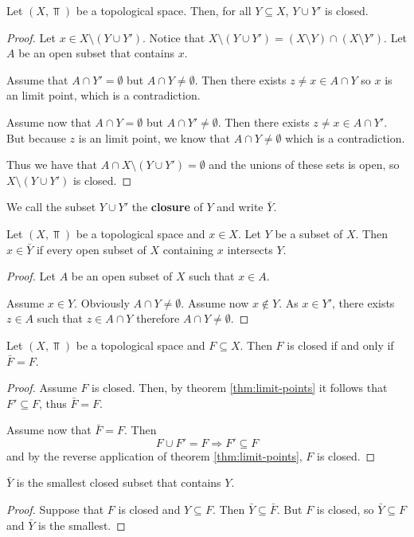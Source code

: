 \documentclass[../../main/main.tex]{subfiles}
\begin{document}
\begin{remark}
  Let $(X, \Top)$ be a topological space. Then, for all $Y \subseteq X$, $Y \cup Y'$ is closed.
\end{remark}
\begin{proof}
  Let $x \in X \setminus (Y \cup Y')$. Notice that $X \setminus (Y \cup Y') = (X \setminus Y) \cap (X \setminus Y')$. Let $A$ be an open subset that contains $x$.

  Assume that $A \cap Y' = \emptyset$ but $A \cap Y \neq \emptyset$. Then there exists $z \neq x \in A \cap Y$ so $x$ is an limit point, which is a contradiction.

  Assume now that $A \cap Y = \emptyset$ but $A \cap Y' \neq \emptyset$. Then there exists $z \neq x \in A \cap Y'$. But because $z$ is an limit point, we know that $A \cap Y \neq \emptyset$ which is a contradiction.

  Thus we have that $A \cap X \setminus (Y \cup Y') = \emptyset$ and the unions of these sets is open, so $X \setminus (Y \cup Y')$ is closed.
\end{proof}

\begin{definition}
  We call the subset $Y \cup Y'$ the {\bf closure} of $Y$ and write $\bar{Y}$.
\end{definition}

\begin{remark}
  Let $(X, \Top)$ be a topological space and $x \in X$. Let $Y$ be a subset of $X$. Then $x \in \bar{Y}$ if every open subset of $X$ containing $x$ intersects $Y$.
\end{remark}
\begin{proof}
  Let $A$ be an open subset of $X$ such that $x \in A$.

  Assume $x \in Y$. Obviously $A \cap Y \neq \emptyset$. Assume now $x \notin Y$. As $x \in Y'$, there exists $z \in A$ such that $z \in A \cap Y$ therefore $A \cap Y \neq \emptyset$.
\end{proof}

\begin{corolary}
  Let $(X, \Top)$ be a topological space and $F \subseteq X$. Then $F$ is closed if and only if $\bar{F} = F$.
\end{corolary}
\begin{proof}
  Assume $F$ is closed. Then, by theorem \ref{thm:limit-points} it follows that $F' \subseteq F$, thus $\bar{F} = F$.

  Assume now that $\bar{F} = F$. Then
    \begin{equation*}
      F \cup F' = F \Longrightarrow F' \subseteq F
    \end{equation*}
    and by the reverse application of theorem \ref{thm:limit-points}, $F$ is closed.
\end{proof}

\begin{corolary}
  $\bar{Y}$ is the smallest closed subset that contains $Y$.
\end{corolary}
\begin{proof}
  Suppose that $F$ is closed and $Y \subseteq F$. Then $\bar{Y} \subseteq \bar{F}$. But $F$ is closed, so $\bar{Y} \subseteq F$ and $\bar{Y}$ is the smallest.
\end{proof}
\end{document}
